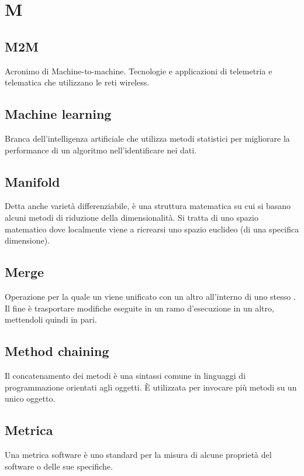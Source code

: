 \section*{M}
\markright{}

\subsection*{M2M}
Acronimo di Machine-to-machine. Tecnologie e applicazioni di telemetria e telematica che utilizzano le reti wireless.

\subsection*{Machine learning}
Branca dell'intelligenza artificiale che utilizza metodi statistici per migliorare la performance di un algoritmo nell'identificare  nei dati.

\subsection*{Manifold}
Detta anche varietà differenziabile, è una struttura matematica su cui si basano alcuni metodi di riduzione della dimensionalità. Si tratta di uno spazio matematico dove localmente viene a ricrearsi uno spazio euclideo (di una specifica dimensione).

\subsection*{Merge}
Operazione per la quale un  viene unificato con un altro all'interno di uno stesso . Il fine è trasportare modifiche eseguite in un ramo d'esecuzione in un altro, mettendoli quindi in pari.

\subsection*{Method chaining}
Il concatenamento dei metodi è una sintassi comune in linguaggi di programmazione orientati agli oggetti. È utilizzata per invocare più metodi su un unico oggetto.

\subsection*{Metrica}
Una metrica software è uno standard per la misura di alcune proprietà del software o delle sue specifiche.

